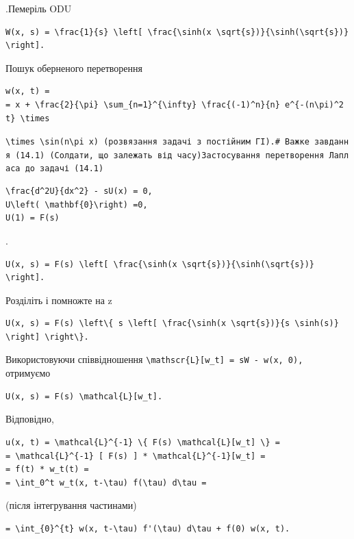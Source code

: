 \documentclass[
  ukrainian,
]{article}
\begin{document}
.Пемеріль ODU

\begin{verbatim}
W(x, s) = \frac{1}{s} \left[ \frac{\sinh(x \sqrt{s})}{\sinh(\sqrt{s})} \right].
\end{verbatim}

Пошук оберненого перетворення

\begin{verbatim}
w(x, t) =
= x + \frac{2}{\pi} \sum_{n=1}^{\infty} \frac{(-1)^n}{n} e^{-(n\pi)^2 t} \times
\end{verbatim}

\texttt{\textquotesingle{}\textbackslash{}times\ \textbackslash{}sin(n\textbackslash{}pi\ x)\textquotesingle{}\ (розв\textquotesingle{}язання\ задачі\ з\ постійним\ ГІ).\#\ Важке\ завдання\ (14.1)\ (Солдати,\ що\ залежать\ від\ часу)Застосування\ перетворення\ Лапласа\ до\ задачі\ (14.1)}

\begin{verbatim}
\frac{d^2U}{dx^2} - sU(x) = 0,
U\left( \mathbf{0}\right) =0,
U(1) = F(s)
\end{verbatim}

.

\begin{verbatim}
U(x, s) = F(s) \left[ \frac{\sinh(x \sqrt{s})}{\sinh(\sqrt{s})} \right].
\end{verbatim}

Розділіть і помножте на z

\begin{verbatim}
U(x, s) = F(s) \left\{ s \left[ \frac{\sinh(x \sqrt{s})}{s \sinh(s)} \right] \right\}.
\end{verbatim}

Використовуючи співвідношення
\texttt{\textbackslash{}mathscr\{L\}{[}w\_t{]}\ =\ sW\ -\ w(x,\ 0),}
отримуємо

\begin{verbatim}
U(x, s) = F(s) \mathcal{L}[w_t].
\end{verbatim}

Відповідно,

\begin{verbatim}
u(x, t) = \mathcal{L}^{-1} \{ F(s) \mathcal{L}[w_t] \} =
= \mathcal{L}^{-1} [ F(s) ] * \mathcal{L}^{-1}[w_t] =
= f(t) * w_t(t) =
= \int_0^t w_t(x, t-\tau) f(\tau) d\tau =
\end{verbatim}

(після інтегрування частинами)

\begin{verbatim}
= \int_{0}^{t} w(x, t-\tau) f'(\tau) d\tau + f(0) w(x, t).
\end{verbatim}
\end{document}
